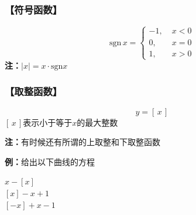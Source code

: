 \subsubsection{\bf 【符号函数】}

  $$\bm{\mathrm{sgn}}\,x =\left\{
	\begin{array}{rl}
	-1,\;&x<0 \\
	0,\;&x=0 \\
	1,\;&x>0
	\end{array}
  \right.$$
  {\bf 注：}$|x|=x \cdot\mathrm{sgn} x$
	

 \subsubsection{\bf 【取整函数】}

  $$y=\left[ \,x\, \right]$$
  $[\,x\,]$表示小于等于$x$的最大整数

	
{\bf 注：}有时候还有所谓的上取整和下取整函数

{{\bf 例：}给出以下曲线的方程}

\begin{center}
	\quad $x-[x]$\\

	\quad $[x]-x+1$\\

	\quad $[-x]+x-1$
\end{center}
	
